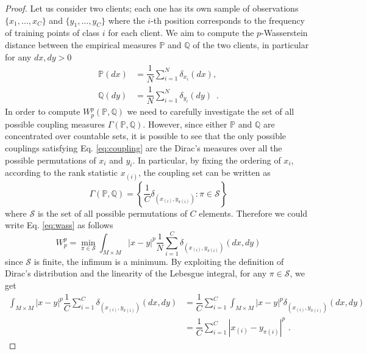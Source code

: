 \begin{proof}
Let us consider two clients; each one has its own sample of observations $\{x_1, \dots, x_C\}$ and $\{y_1, \dots, y_C\}$ where the $i$-th position corresponds to the frequency of training points of class $i$ for each client. We aim to compute the $p$-Wasserstein distance between the empirical measures $\mathbb{P}$ and $\mathbb{Q}$ of the two clients, in particular for any $dx, dy > 0$
\begin{equation}
\begin{split}
    \mathbb{P}(dx) &= \dfrac{1}{N} \sum_{i = 1}^N \delta_{x_i}(dx), \\
    \mathbb{Q}(dy) &= \dfrac{1}{N} \sum_{i = 1}^N \delta_{y_i}(dy)\,\,\,.
\end{split}
\end{equation}
In order to compute $W_p^p(\mathbb{P}, \mathbb{Q})$ we need to carefully investigate the set of all possible coupling measures $\Gamma(\mathbb{P}, \mathbb{Q})$. However, since either $\mathbb{P}$ and $\mathbb{Q}$ are concentrated over countable sets, it is possible to see that the only possible couplings satisfying Eq. \ref{eq:coupling} are the Dirac's measures over all the possible permutations of $x_i$ and $y_i$. In particular, by fixing the ordering of $x_i$, according to the rank statistic $x_{(i)}$, the coupling set can be written as
\begin{equation}
    \Gamma(\mathbb{P}, \mathbb{Q}) = \left\{\dfrac{1}{C} \delta_{(x_{(i)}, y_{\pi(i)})}: \pi \in \mathcal{S}\right\}
\end{equation}
where $\mathcal{S}$  is the set of all possible permutations of $C$ elements. Therefore we could write Eq. \ref{eq:wass} as follows
\begin{equation}
    W_p^p = \min_{\pi \in \mathcal{S}} \int_{M\times M}|x - y|^p \dfrac{1}{N} \sum_{i = 1}^C \delta_{(x_{(i)}, y_{\pi(i)})}(dx,dy)
\end{equation}
since $\mathcal{S}$ is finite, the infimum is a minimum. By exploiting the definition of Dirac's distribution and the linearity of the Lebesgue integral, for any $\pi \in \mathcal{S}$, we get
\begin{equation}
\begin{split}
\int_{M\times M}|x - y|^p \dfrac{1}{C}\sum_{i = 1}^C \delta_{(x_{(i)}, y_{\pi(i)})}(dx,dy) &= \dfrac{1}{C}\sum_{i = 1}^C\int_{M\times M} |x - y|^p\delta_{(x_{(i)}, y_{\pi(i)})}(dx,dy)\\
&=\dfrac{1}{C}\sum_{i = 1}^C |x_{(i)} - y_{\pi(i)}|^p\,\,.
\end{split} 

\end{equation}
\end{proof}
